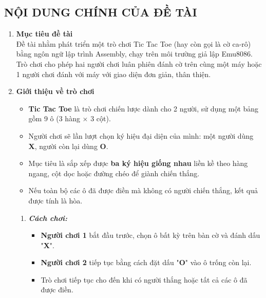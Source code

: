
\subsection*{\textbf{\large NỘI DUNG CHÍNH CỦA ĐỀ TÀI}}

\begin{enumerate}
    \item \textbf{Mục tiêu đề tài}\\
    Đề tài nhằm phát triển một trò chơi Tic Tac Toe (hay còn gọi là cờ ca-rô) bằng ngôn ngữ lập trình Assembly, chạy trên môi trường giả lập Emu8086. Trò chơi cho phép hai người chơi luân phiên đánh cờ trên cùng một máy hoặc 1 người chơi đánh với máy với giao diện đơn giản, thân thiện.
    \item \textbf{Giới thiệu về trò chơi}
    \begin{itemize}
        \item \textbf{Tic Tac Toe} là trò chơi chiến lược dành cho 2 người, sử dụng một bảng gồm 9 ô (3 hàng $\times$ 3 cột).
        \item Người chơi sẽ lần lượt chọn ký hiệu đại diện của mình: một người dùng \textbf{X}, người còn lại dùng \textbf{O}.
        \item Mục tiêu là sắp xếp được \textbf{ba ký hiệu giống nhau} liền kề theo hàng ngang, cột dọc hoặc đường chéo để giành chiến thắng.
        \item Nếu toàn bộ các ô đã được điền mà không có người chiến thắng, kết quả được tính là hòa.
    \end{itemize}
    \begin{enumerate}[label=\alph*]
        \item \textbf{\textit{Cách chơi:}}
        \begin{itemize}
            \item \textbf{Người chơi 1} bắt đầu trước, chọn ô bất kỳ trên bàn cờ và đánh dấu "\textbf{X}".
            \item \textbf{Người chơi 2} tiếp tục bằng cách đặt dấu "\textbf{O}" vào ô trống còn lại.
            \item Trò chơi tiếp tục cho đến khi có người thắng hoặc tất cả các ô đã được điền.

\end{itemize}
\end{enumerate}
\end{enumerate}

